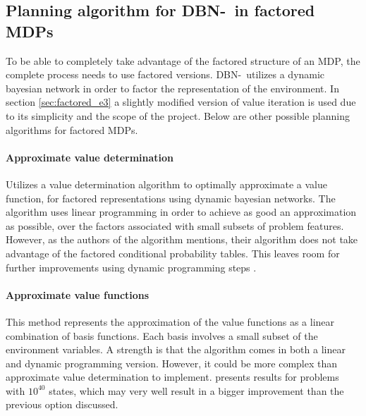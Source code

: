 \subsection{Planning algorithm for DBN-\etre\ in factored MDPs}
\label{sec:better_planing_algos}

To be able to completely take advantage of the factored structure of an MDP, the complete
process needs to use factored versions. DBN-\etre\ utilizes a dynamic
bayesian network in order to factor the representation of the environment. In
section \ref{sec:factored_e3} a slightly modified version of value iteration is
used due to its simplicity and the scope of the project. Below are other
possible planning algorithms for factored MDPs.

\paragraph{Approximate value determination}

Utilizes a value determination algorithm to optimally approximate a value
function, for factored representations using dynamic bayesian networks. The
algorithm uses linear programming in order to achieve as good an approximation
as possible, over the factors associated with small subsets of problem
features. However, as the authors of the algorithm mentions, their algorithm
does not take advantage of the factored conditional probability tables. This
leaves room for further improvements using dynamic programming steps
\parencite{koller1999computing}.

\paragraph{Approximate value functions}

This method represents the approximation of the value functions as a linear
combination of basis functions. Each basis involves a small subset of the
environment variables. A strength is that the algorithm comes in both a linear
and dynamic programming version. However, it could be more complex than approximate
value determination to implement. \textcite{guestrin2003efficient} presents
results for problems with $10^{40}$ states, which may very well result in a
bigger improvement than the previous option discussed.
